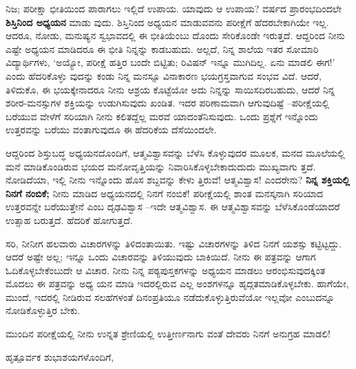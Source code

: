 ನಿಜ; ಪರೀಕ್ಷಾ ಭೀತಿಯಿಂದ ಪಾರಾಗಲು ಇಲ್ಲಿದೆ ಉಪಾಯ. ಯಾವುದು ಆ ಉಪಾಯ? ವರ್ಷದ ಪ್ರಾರಂಭದಿಂದಲೇ \textbf{ಶಿಸ್ತಿನಿಂದ ಅಧ್ಯಯನ} ಮಾಡು ವುದು. ಶಿಸ್ತಿನಿಂದ ಅಧ್ಯಯನ ಮಾಡುವವನು ಪರೀಕ್ಷೆಗೆ ಹೆದರಬೇಕಾಗಿಯೇ ಇಲ್ಲ. ಆದರೂ, ನೋಡು, ಮನುಷ್ಯನ ಸ್ವಭಾವದಲ್ಲಿ ಈ ಭೀತಿಯೆಂಬು ದೊಂದು ಸೇರಿಕೊಂಡೇ ಇರುತ್ತದೆ. ಆದ್ದರಿಂದ ನೀನು ಎಷ್ಟೇ ಅಧ್ಯಯನ ಮಾಡಿದರೂ ಈ ಭೀತಿ ನಿನ್ನನ್ನು ಕಾಡಬಹುದು. ಅಲ್ಲದೆ, ನಿನ್ನ ಶಾಲೆಯ ಇತರ ಸೋಮಾರಿ ವಿದ್ಯಾರ್ಥಿಗಳು, ‘ಅಯ್ಯೋ, ಪರೀಕ್ಷೆ ಹತ್ತಿರ ಬಂದೇ ಬಿಟ್ಟಿತು; ರಿವಿಷನ್ ಇನ್ನೂ ಮುಗಿದಿಲ್ಲ. ಏನು ಮಾಡಲಿ ಈಗ!’ ಎಂದು ಹೆದರಿಕೊಳ್ಳು ವುದನ್ನು ಕಂಡು ನಿನ್ನ ಮನಸ್ಸೂ ವಿನಾಕಾರಣ ಭಯಗ್ರಸ್ತವಾಗುವ ಸಂಭವ ವಿದೆ. ಆದರೆ, ತಿಳಿದುಕೊ, ಈ ಭಯಕ್ಕೇನಾದರೂ ನೀನು ಆಶ್ರಯ ಕೊಟ್ಟೆಯೋ ಅದು ನಿನ್ನನ್ನು ಸಾಯಿಸದಿರಬಹುದು, ಆದರೆ ನಿನ್ನ ಶರೀರ-ಮನಸ್ಸುಗಳ ಶಕ್ತಿಯನ್ನು ಉಡುಗಿಸುವುದು ಖಂಡಿತ. ಇದರ ಪರಿಣಾಮವಾಗಿ ಆಗುವುದಿಷ್ಟೆ –ಪರೀಕ್ಷೆಯಲ್ಲಿ ಬರೆಯುವ ವೇಳೆಗೆ ಸರಿಯಾಗಿ ನೀನು ಕಲಿತದ್ದೆಲ್ಲ ಮರವೆ ಯಾದಂತೆನಿಸುವುದು. ಒಂದು ಪ್ರಶ್ನೆಗೆ ಇನ್ನೊಂದು ಉತ್ತರವನ್ನು ಬರೆಯು ವಂತಾಗುವುದೂ ಈ ಹೆದರಿಕೆಯ ದೆಸೆಯಿಂದಲೇ.

ಆದ್ದರಿಂದ ಶಿಸ್ತುಬದ್ಧ ಅಧ್ಯಯನದೊಂದಿಗೆ, ಆತ್ಮವಿಶ್ವಾಸವನ್ನು ಬೆಳೆಸಿ ಕೊಳ್ಳುವುದರ ಮೂಲಕ, ಮನದ ಮೂಲೆಯಲ್ಲಿ ಮನೆ ಮಾಡಿಕೊಂಡಿರುವ ಭಯದ ಮನೋವೃತ್ತಿಯನ್ನು ನಿವಾರಿಸಿಕೊಳ್ಳಬೇಕಾದುದುದು ಮುಖ್ಯವಾಗು ತ್ತದೆ. ನೋಡಿದೆಯಾ, ಇಲ್ಲಿ ನೀನು ಇನ್ನೊಂದು ಹೊಸ ಶಬ್ದವನ್ನು ಕೇಳು ತ್ತಿರುವೆ! ಆತ್ಮವಿಶ್ವಾಸ! ಎಂದರೇನು? \textbf{ನಿನ್ನ ಶಕ್ತಿಯಲ್ಲಿ ನಿನಗೆ ನಂಬಿಕೆ;} ನೀನು ಮಾಡಿದ ಅಧ್ಯಯನದಲ್ಲಿ ನಿನಗೆ ನಂಬಿಕೆ! ಪರೀಕ್ಷೆಯಲ್ಲಿ ಶಾಂತ ಮನಸ್ಕನಾಗಿ ಸರಿಯಾದ ಉತ್ತರವನ್ನೇ ಬರೆಯುತ್ತೇನೆ ಎಂಬ ದೃಢವಿಶ್ವಾಸ –ಇದೇ ಆತ್ಮವಿಶ್ವಾಸ. ಈ ಆತ್ಮವಿಶ್ವಾಸವನ್ನು ಬೆಳೆಸಿಕೊಂಡೆಯಾದರೆ ಉತ್ಸಾಹ ಬರುತ್ತದೆ. ಹೆದರಿಕೆ ಹೋಗುತ್ತದೆ. 

ಸರಿ, ನೀನೀಗ ಹಲವಾರು ವಿಚಾರಗಳನ್ನು ತಿಳಿದಂತಾಯಿತು. ಇಷ್ಟು ವಿಚಾರಗಳನ್ನು ತಿಳಿದ ನಿನಗೆ ಯಶಸ್ಸು ಕಟ್ಟಿಟ್ಟದ್ದು. ಆದರೆ ಅಷ್ಟೇ ಅಲ್ಲ; ಇನ್ನೂ ಒಂದು ವಿಚಾರವನ್ನು ತಿಳಿಯುವುದು ಬಾಕಿಯಿದೆ. ನೀನು ಈ ಪತ್ರವನ್ನು ಆಗಾಗ ಓದಿಕೊಳ್ಳಬೇಕೆಂಬುದೇ ಆ ವಿಚಾರ. ನೀನು ನಿನ್ನ ಪಠ್ಯಪುಸ್ತಕಗಳನ್ನು ಅಧ್ಯಯನ ಮಾಡಲು ಆರಂಭಿಸುವುದಕ್ಕಿಂತ ಮೊದಲು ಈ ಪತ್ರವನ್ನು ಅಧ್ಯ ಯನ ಮಾಡಿ ಇದರಲ್ಲಿರುವ ಎಲ್ಲ ಅಂಶಗಳನ್ನೂ ಹೃದ್ಗತಮಾಡಿಕೊಳ್ಳಬೇಕು. ಹಾಗೆಯೇ, ಮುಂದೆ, ಇದರಲ್ಲಿ ನೀಡಿರುವ ಸಲಹೆಗಳಂತೆ ದಿನಂಪ್ರತಿಯೂ ನಡೆದುಕೊಳ್ಳುತ್ತಿರುವೆಯೋ ಇಲ್ಲವೋ ಎಂಬುದನ್ನೂ ನೋಡಿಕೊಳ್ಳುತ್ತಿರ ಬೇಕು. 

ಮುಂದಿನ ಪರೀಕ್ಷೆಯಲ್ಲಿ ನೀನು ಉನ್ನತ ಶ್ರೇಣಿಯಲ್ಲಿ ಉತ್ತೀರ್ಣನಾಗು ವಂತೆ ದೇವರು ನಿನಗೆ ಅನುಗ್ರಹ ಮಾಡಲಿ! 

ಹೃತ್ಪೂರ್ವಕ ಶುಭಾಶಯಗಳೊಂದಿಗೆ,


